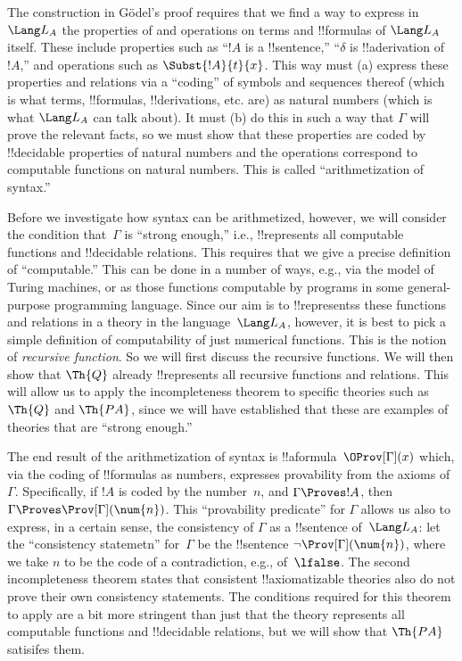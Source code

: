 \documentclass[../../../include/open-logic-section]{subfiles}
\begin{document}
The construction in G\"odel's proof requires that we find a way to
express in $\Lang L_A$ the properties of and operations on terms and
!!{formula}s of $\Lang L_A$ itself. These include properties such as
``$!A$ is a !!{sentence},'' ``$\delta$ is !!a{derivation} of~$!A$,''
and operations such as $\Subst{!A}{t}{x}$.  This way must (a) express
these properties and relations via a ``coding'' of symbols and
sequences thereof (which is what terms, !!{formula}s, !!{derivation}s,
etc. are) as natural numbers (which is what $\Lang L_A$ can talk
about). It must (b) do this in such a way that $\Gamma$ will prove the
relevant facts, so we must show that these properties are coded by
!!{decidable} properties of natural numbers and the operations
correspond to computable functions on natural numbers. This is called
``arithmetization of syntax.''

Before we investigate how syntax can be arithmetized, however, we will
consider the condition that~$\Gamma$ is ``strong enough,'' i.e.,
!!{represents} all computable functions and !!{decidable} relations.
This requires that we give a precise definition of ``computable.''
This can be done in a number of ways, e.g., via the model of Turing
machines, or as those functions computable by programs in some
general-purpose programming language.  Since our aim is to
!!{represents}s these functions and relations in a theory in the
language~$\Lang L_A$, however, it is best to pick a simple definition
of computability of just numerical functions.  This is the notion of
\emph{recursive function}.  So we will first discuss the recursive
functions. We will then show that $\Th{Q}$ already !!{represents} all
recursive functions and relations.  This will allow us to apply the
incompleteness theorem to specific theories such as $\Th{Q}$ and
$\Th{PA}$, since we will have established that these are examples of
theories that are ``strong enough.''

The end result of the arithmetization of syntax is
!!a{formula}~$\OProv[\Gamma](x)$ which, via the coding of !!{formula}s
as numbers, expresses provability from the axioms of~$\Gamma$.
Specifically, if $!A$ is coded by the number~$n$, and $\Gamma \Proves
!A$, then $\Gamma \Proves \Prov[\Gamma](\num{n})$.  This ``provability
predicate'' for $\Gamma$ allows us also to express, in a certain
sense, the consistency of $\Gamma$ as a !!{sentence} of~$\Lang L_A$:
let the ``consistency statemetn'' for~$\Gamma$ be the !!{sentence}
$\lnot \Prov[\Gamma](\num{n})$, where we take $n$ to be the code of a
contradiction, e.g., of~$\lfalse$.  The second incompleteness theorem
states that consistent !!{axiomatizable} theories also do not prove
their own consistency statements.  The conditions required for this
theorem to apply are a bit more stringent than just that the theory
represents all computable functions and !!{decidable} relations, but
we will show that $\Th{PA}$ satisifes them.
\end{document}
